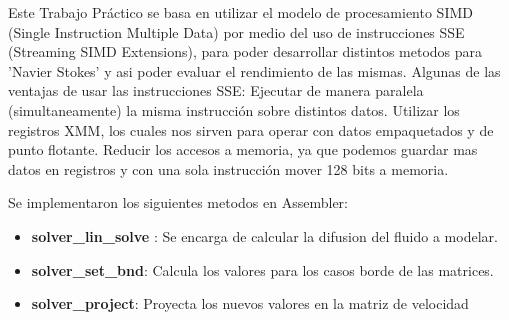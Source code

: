 Este Trabajo Pr\'actico se basa en utilizar el modelo de procesamiento SIMD (Single Instruction Multiple Data) por medio del uso de instrucciones SSE (Streaming SIMD Extensions), para poder desarrollar distintos metodos para 'Navier Stokes' y asi poder evaluar el rendimiento de las mismas.
Algunas de las ventajas de usar las instrucciones SSE:
Ejecutar de manera paralela (simultaneamente) la misma instrucci\'on sobre distintos datos.
Utilizar los registros XMM, los cuales nos sirven para operar con datos empaquetados y de punto flotante.
Reducir los accesos a memoria, ya que podemos guardar mas datos en registros y con una sola instrucci\'on mover 128 bits a memoria.

Se implementaron los siguientes metodos en Assembler:

\begin{itemize}
\item \textbf{solver\_lin\_solve} : Se encarga de calcular la difusion del fluido a modelar.
\item \textbf{solver\_set\_bnd}: Calcula los valores para los casos borde de las matrices.
\item \textbf{solver\_project}: Proyecta los nuevos valores en la matriz de velocidad
\end{itemize}


